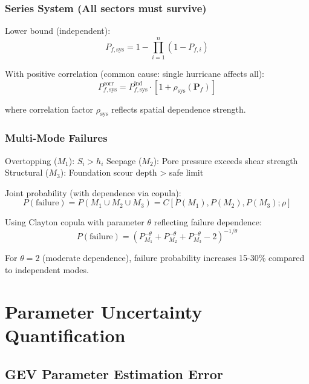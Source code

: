 \documentclass[review]{elsarticle}
\begin{document}
\subsubsection{Series System (All sectors must survive)}

Lower bound (independent):
\begin{equation}
P_{f,\text{sys}} = 1 - \prod_{i=1}^n (1-P_{f,i})
\end{equation}

With positive correlation (common cause: single hurricane affects all):
\begin{equation}
P_{f,\text{sys}}^{\text{corr}} = P_{f,\text{sys}}^{\text{ind}} \cdot [1 + \rho_{\text{sys}}(\mathbf{P}_f)]
\label{eq:corr_sys_failure}
\end{equation}

where correlation factor $\rho_{\text{sys}}$ reflects spatial dependence strength.

\subsubsection{Multi-Mode Failures}

Overtopping ($M_1$): $S_i > h_i$
Seepage ($M_2$): Pore pressure exceeds shear strength
Structural ($M_3$): Foundation scour depth > safe limit

Joint probability (with dependence via copula):
\begin{equation}
P(\text{failure}) = P(M_1 \cup M_2 \cup M_3) = C[P(M_1), P(M_2), P(M_3); \rho]
\label{eq:multimode}
\end{equation}

Using Clayton copula with parameter $\theta$ reflecting failure dependence:
\begin{equation}
P(\text{failure}) = (P_{M_1}^{-\theta} + P_{M_2}^{-\theta} + P_{M_3}^{-\theta} - 2)^{-1/\theta}
\end{equation}

For $\theta = 2$ (moderate dependence), failure probability increases 15-30\% compared to independent modes.

\section{Parameter Uncertainty Quantification}

\subsection{GEV Parameter Estimation Error}
\end{document}
